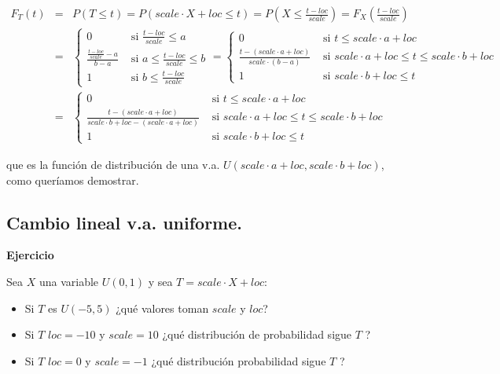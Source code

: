\documentclass[]{book}
\begin{document}
\[
\begin{eqnarray*}
F_T(t)&=&P(T\leq t)= P(scale\cdot X+ loc\leq t)= P\left(X\leq \frac{t-loc}{scale}\right)=F_X\left(\frac{t-loc}{scale}\right)\\
&=&
\left\{\begin{array}{ll} 0 & \mbox{ si } \frac{t-loc}{scale}\leq a\\\frac{\frac{t-loc}{scale}-a}{b-a} & \mbox{ si } a\leq \frac{t-loc}{scale}\leq b\\1 & \mbox{ si } b\leq \frac{t-loc}{scale}\end{array}\right.=
\left\{\begin{array}{ll} 0 & \mbox{ si }  t\leq scale\cdot a +loc \\
\frac{t-(scale\cdot a+loc)}{scale\cdot (b-a)} & \mbox{ si } scale\cdot a+loc \leq t\leq scale\cdot b+loc \\
1 & \mbox{ si } scale\cdot b+loc\leq t \end{array}\right.\\
& = &
\left\{\begin{array}{ll} 0 & \mbox{ si }  t\leq scale\cdot a +loc \\
\frac{t-(scale\cdot a+loc)}{scale\cdot b+loc-(scale\cdot a+loc)} & \mbox{ si } scale\cdot a+loc \leq t\leq scale\cdot b+loc \\
1 & \mbox{ si } scale\cdot b+loc\leq t\end{array}\right.
\end{eqnarray*}
\]

que es la función de distribución de una v.a. \(U(scale\cdot a+loc,scale\cdot b+loc)\), como queríamos demostrar.

\hypertarget{cambio-lineal-v.a.-uniforme.-3}{%
\subsection{Cambio lineal v.a. uniforme.}\label{cambio-lineal-v.a.-uniforme.-3}}

\textbf{Ejercicio}

Sea \(X\) una variable \(U(0,1)\) y sea \(T=scale\cdot X+loc\):

\begin{itemize}
\item
  Si \(T\) es \(U(-5,5)\) ¿qué valores toman \(scale\) y \(loc\)?
\item
  Si \(T\) \(loc=-10\) y \(scale=10\) ¿qué distribución de probabilidad sigue \(T\) ?
\item
  Si \(T\) \(loc=0\) y \(scale=-1\) ¿qué distribución probabilidad sigue \(T\) ?
\end{itemize}
\end{document}
